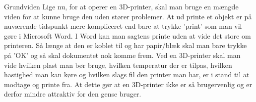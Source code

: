 Grundviden
Lige nu, for at operer en 3D-printer, skal man bruge en mængde viden for at kunne bruge den uden stører problemer. At ud printe et objekt er på nuværende tidspunkt mere kompliceret end bare at trykke ’print’ som man vil gøre i Microsoft Word. I Word kan man sagtens printe uden at vide det store om printeren. Så længe at den er koblet til og har papir/blæk skal man bare trykke på ’OK’ og så skal dokumentet nok komme frem. 
Ved en 3D-printer skal man vide hvilken plast man bør bruge, hvilken temperatur der er tilpas, hvilken hastighed man kan køre og hvilken slags fil den printer man har, er i stand til at modtage og printe fra.
At dette gør at en 3D-printer ikke er så brugervenlig og er derfor mindre attraktiv for den gense bruger.
